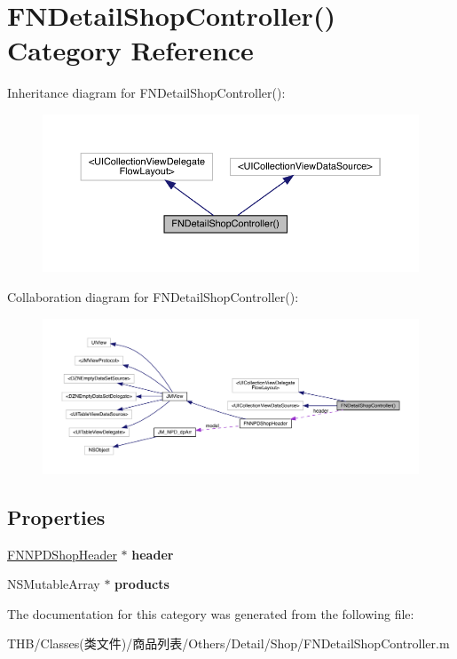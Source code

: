 \hypertarget{category_f_n_detail_shop_controller_07_08}{}\section{F\+N\+Detail\+Shop\+Controller() Category Reference}
\label{category_f_n_detail_shop_controller_07_08}


Inheritance diagram for F\+N\+Detail\+Shop\+Controller()\+:\nopagebreak
\begin{figure}[H]
\begin{center}
\leavevmode
\includegraphics[width=350pt]{category_f_n_detail_shop_controller_07_08__inherit__graph}
\end{center}
\end{figure}


Collaboration diagram for F\+N\+Detail\+Shop\+Controller()\+:\nopagebreak
\begin{figure}[H]
\begin{center}
\leavevmode
\includegraphics[width=350pt]{category_f_n_detail_shop_controller_07_08__coll__graph}
\end{center}
\end{figure}
\subsection*{Properties}
\begin{DoxyCompactItemize}
\item 
\mbox{\label{category_f_n_detail_shop_controller_07_08_affc52298e92fb5d0d6de93ffc85d4b0e}} 
\mbox{\hyperlink{interface_f_n_n_p_d_shop_header}{F\+N\+N\+P\+D\+Shop\+Header}} $\ast$ {\bfseries header}
\item 
\mbox{\label{category_f_n_detail_shop_controller_07_08_aff62d66c5493cc5c3ca315e7b32f4040}} 
N\+S\+Mutable\+Array $\ast$ {\bfseries products}
\end{DoxyCompactItemize}


The documentation for this category was generated from the following file\+:\begin{DoxyCompactItemize}
\item 
T\+H\+B/\+Classes(类文件)/商品列表/\+Others/\+Detail/\+Shop/F\+N\+Detail\+Shop\+Controller.\+m\end{DoxyCompactItemize}
